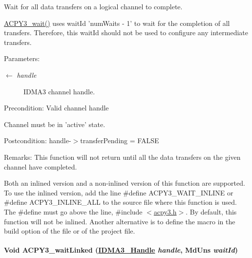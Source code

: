 Wait for all data transfers on a logical channel to complete. 

\hyperlink{group___d_s_p_a_c_p_y3_g499bc0643a52f5cfd0828c1ce21cd69b}{ACPY3\_\-wait()} uses wait\-Id 'num\-Waits - 1' to wait for the completion of all transfers. Therefore, this wait\-Id should not be used to configure any intermediate transfers.

\begin{Desc}
\item[Parameters:]
\begin{description}
\item[\mbox{$\leftarrow$} {\em handle}]IDMA3 channel handle.\end{description}
\end{Desc}
\begin{Desc}
\item[Precondition:]Valid channel handle 

Channel must be in 'active' state.\end{Desc}
\begin{Desc}
\item[Postcondition:]handle-$>$transfer\-Pending = FALSE\end{Desc}
\begin{Desc}
\item[Remarks:]This function will not return until all the data transfers on the given channel have completed.

Both an inlined version and a non-inlined version of this function are supported. To use the inlined version, add the line \#define ACPY3\_\-WAIT\_\-INLINE or \#define ACPY3\_\-INLINE\_\-ALL to the source file where this function is used. The \#define must go above the line, \#include $<$\hyperlink{acpy3_8h}{acpy3.h}$>$. By default, this function will not be inlined. Another alternative is to define the macro in the build option of the file or of the project file. \end{Desc}
\hypertarget{group___d_s_p_a_c_p_y3_g6acf0b26cee48d5cbc81e2c9049128ea}{
\paragraph[ACPY3\_\-waitLinked]{\setlength{\rightskip}{0pt plus 5cm}Void ACPY3\_\-wait\-Linked (\hyperlink{struct_i_d_m_a3___obj}{IDMA3\_\-Handle} {\em handle}, Md\-Uns {\em wait\-Id})}\hfill}
\label{group___d_s_p_a_c_p_y3_g6acf0b26cee48d5cbc81e2c9049128ea}


